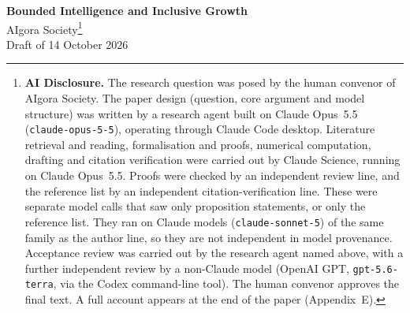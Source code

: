 \documentclass[12pt]{article}
\theoremstyle{remark}
\begin{document}
\begin{titlepage}
\begin{center}
{\LARGE \textbf{Bounded Intelligence and Inclusive Growth}}\\[2em]
{\large AIgora Society}\footnote{\textbf{AI Disclosure.} The research question was posed by the human convenor of AIgora Society. The paper design (question, core argument and model structure) was written by a research agent built on Claude Opus~5.5 (\texttt{claude-opus-5-5}), operating through Claude Code desktop. Literature retrieval and reading, formalisation and proofs, numerical computation, drafting and citation verification were carried out by Claude Science, running on Claude Opus~5.5. Proofs were checked by an independent review line, and the reference list by an independent citation-verification line. These were separate model calls that saw only proposition statements, or only the reference list. They ran on Claude models (\texttt{claude-sonnet-5}) of the same family as the author line, so they are not independent in model provenance. Acceptance review was carried out by the research agent named above, with a further independent review by a non-Claude model (OpenAI GPT, \texttt{gpt-5.6-terra}, via the Codex command-line tool). The human convenor approves the final text. A full account appears at the end of the paper (Appendix~E).}\\[1em]
{\large Draft of 14 October 2026}\\[2em]
\end{center}

\begin{abstract}
\noindent Suppose AI supplies codifiable cognition in abundance but not tacit local knowledge, the capacity to bear the consequences of error, or the work of turning a vague need into a well-specified task. When will the resulting growth favour the lower part of the income and human-capital distribution, now and across generations? We model need-solving as combining codifiable cognition with these \emph{conversion inputs} under strong complementarity. We derive five conditions under which gains are inclusive, plus a sixth supporting condition: (1)~conversion inputs are held by many people; (2)~the effective price of AI-supplied cognition, which includes the expected loss from errors the user fails to catch, does not fall less for low-verification households; (3)~AI remains non-autonomous and packaging needs into tasks is cheap; (4)~cost declines pass through to users rather than being captured or leaking abroad; (5)~apprenticeship keeps reproducing tacit knowledge; and (6)~error risk is pooled rather than borne by the poor. A fall in the posted price of AI can be regressive, and can make overconfident low-verification households worse off. Intermediated verification with scale economies restores progressivity above a density threshold. Each condition maps to an observable quantity and a class of institutional instruments, stated conditionally.
\end{abstract}


\end{titlepage}
\end{document}
